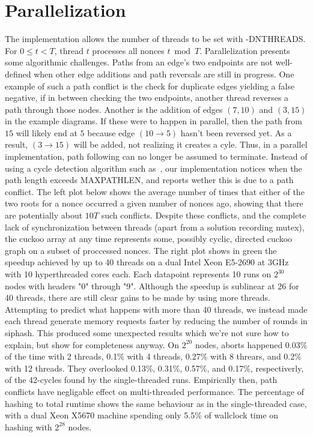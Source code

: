 \documentclass[11pt, oneside]{article}
\newcommand{\hash}{{\rm siphash}}
\begin{document}
\section{Parallelization}
The implementation allows the number of threads to be set with -DNTHREADS.
For $0\leq t < T$, thread $t$ processes all nonces $t \bmod T$.
Parallelization presents some algorithmic challenges. Paths from an edge's two endpoints
are not well-defined when other edge additions and path reversals are still in progress.
One example of such a path conflict is the check for duplicate edges yielding a false negative,
if in between checking the two endpoints, another thread reverses a path through those nodes.
Another is the addition of edges $(7,10)$ and $(3,15)$ in the example diagrams.
If these were to happen in parallel, then the path from $15$ will likely end at $5$ because
edge $(10 \rightarrow 5)$ hasn't been reversed yet.
As a result, $(3 \rightarrow 15)$ will be added, not realizing it creates a cyle.
Thus, in a parallel implementation, path following can no longer be assumed to terminate.
Instead of using a cycle detection algorithm such as~\cite{1980-brent-cycles}, our implementation
notices when the path length exceeds MAXPATHLEN, and reports wether this is due to a path conflict.
The left plot below shows the average number of times that either of the two roots
for a nonce occurred a given number of nonces ago, showing that there are potentially
about $10T$ such conflicts.
Despite these conflicts, and the complete lack of synchronization between threads
(apart from a solution recording mutex),
the cuckoo array at any time represents some, possibly cyclic, directed cuckoo graph
on a subset of proccessed nonces.
The right plot shows in green the speedup achieved by up to 40 threads on a dual Intel Xeon
E5-2690 at 3GHz with 10 hyperthreaded cores each.
Each datapoint represents 10 runs on $2^{30}$ nodes with headers "0" through "9".
Although the speedup is sublinear at 26 for 40 threads, there are still clear gains to be made
by using more threads.
Attempting to predict what happens with more than 40 threads, we instead made each thread generate
memory requests faster by reducing the number of rounds in \hash. This produced some unexpected
results which we're not sure how to explain, but show for completeness anyway.
On $2^{20}$ nodes, aborts happened 0.03\% of the time with 2 threads, 0.1\% with 4 threads, 0.27\% with
8 threars, and 0.2\% with 12 threads.
They overlooked 0.13\%, 0.31\%, 0.57\%, and 0.17\%, respectiverly, of the 42-cycles
found by the single-threaded runs.
Empirically then, path conflicts have negligable effect on multi-threaded performance.
The percentage of hashing to total runtime shows the same behaviour as in the single-threaded case,
with a dual Xeon X5670 machine spending only 5.5\% of wallclock time on hashing with $2^{28}$ nodes.
\end{document}
